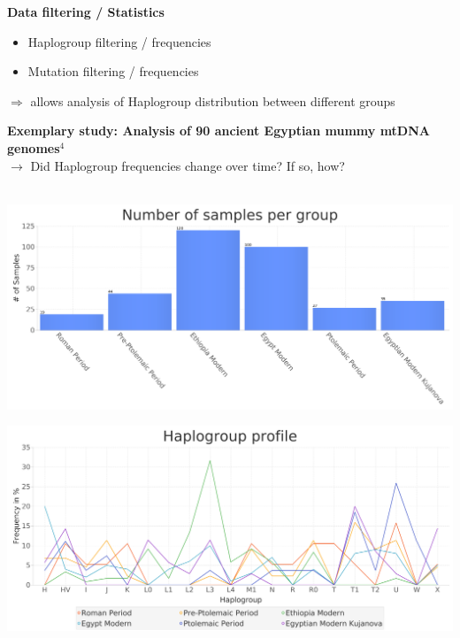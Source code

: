\documentclass[a0paper,portrait]{baposter}
\begin{document}
\begin{poster}
{\begin{minipage}[t]{0.5\textwidth}
	\end{minipage}
	\hspace{0.5em}
	\begin{minipage}[t]{0.5\textwidth}
		\textbf{Data filtering / Statistics}
		\begin{itemize}[leftmargin=*]
			\item Haplogroup filtering / frequencies
			\item Mutation filtering / frequencies
		\end{itemize}
	\end{minipage}
\begin{center}$\Rightarrow$ allows analysis of Haplogroup distribution between different groups\end{center}
	\vspace{1em}

\textbf{Exemplary study: Analysis of 90 ancient Egyptian mummy mtDNA genomes$^4$}\\\vspace{4mm}
$\rightarrow$ Did Haplogroup frequencies change over time? If so, how?\\
\\
	\begin{minipage}{0.5\textwidth}
		\includegraphics[width=\textwidth]{figures/group_sizes2.png}
	\end{minipage}
	\begin{minipage}{0.5\textwidth}
			\includegraphics[width=\textwidth]{figures/profile.png}
	\end{minipage}

}
\end{poster}
\end{document}
